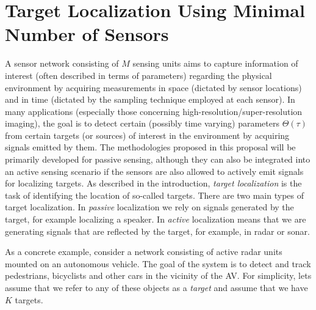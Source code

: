\section{Target Localization Using Minimal Number of Sensors}

\iffalse
A sensor network consisting of $M$ sensing units aims to capture information of interest (often described in terms of parameters) regarding the physical environment by acquiring measurements in space (dictated by sensor locations) and in time (dictated by the sampling technique employed at each sensor). In many applications (especially those concerning high-resolution/super-resolution imaging), the goal is to detect certain (possibly time varying) parameters $\Theta(\tau)$ from certain targets (or sources) of interest in the environment by acquiring signals emitted by them. The methodologies proposed in this proposal will be primarily developed for passive sensing, although they can also be integrated into an active sensing scenario if the sensors are also allowed to actively emit signals for localizing targets.
\filcenter
{}
As described in the introduction, {\em target localization} is the task of identifying the location of so-called targets. There are two main types of target localization. In {\em passive} localization we rely on signals generated by the target, for example localizing a speaker.   In {\em active} localization means that we are generating signals that are reflected by the target, for example, in radar or sonar.

As a concrete example, consider a network consisting of active radar units mounted on an autonomous vehicle. The goal of the system is to detect and track pedestrians, bicyclists and other cars in the vicinity of the AV. For simplicity, lets assume that we refer to any of these objects as a {\em target} and assume that we have $K$ targets.


